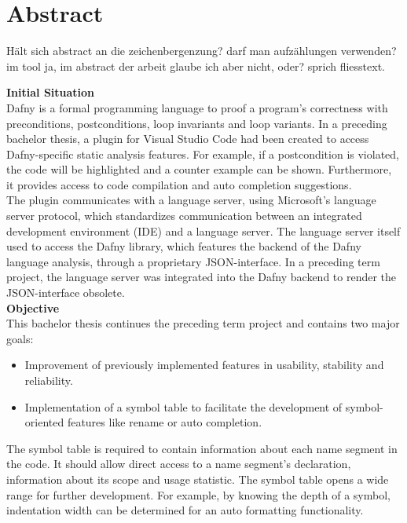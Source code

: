 \section{Abstract}
\label{section:abstract}

Hält sich abstract an die zeichenbergenzung?
darf man aufzählungen verwenden? im tool ja, im abstract der arbeit glaube ich aber nicht, oder? sprich fliesstext. 

\textbf{Initial Situation}\\
Dafny is a formal programming language to proof a program's correctness with preconditions, postconditions, loop invariants and loop variants.
In a preceding bachelor thesis, a plugin for Visual Studio Code had been created to access Dafny-specific static analysis features.
For example, if a postcondition is violated, the code will be highlighted and a counter example can be shown.
Furthermore, it provides access to code compilation and auto completion suggestions.\\

The plugin communicates with a language server, using Microsoft's language server protocol, which standardizes communication between an integrated development environment (IDE) and a language server.
The language server itself used to access the Dafny library, which features the backend of the Dafny language analysis, through a proprietary JSON-interface.
In a preceding term project, the language server was integrated into the Dafny backend to render the JSON-interface obsolete.\\

\textbf{Objective}\\
This bachelor thesis continues the preceding term project and contains two major goals:
\begin{itemize}
    \item Improvement of previously implemented features in usability, stability and reliability.
    \item Implementation of a symbol table to facilitate the development of symbol-oriented features like rename or auto completion.
\end{itemize}
The symbol table is required to contain information about each name segment in the code.
It should allow direct access to a name segment's declaration, information about its scope and usage statistic.
The symbol table opens a wide range for further development.
For example, by knowing the depth of a symbol, indentation width can be determined for an auto formatting functionality.\\

